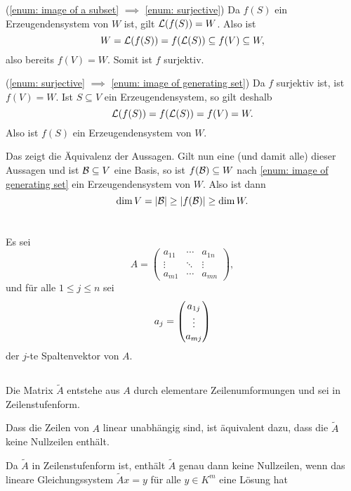 \documentclass[a4paper,10pt]{scrartcl}
\begin{document}
(\ref{enum: image of a subset} $\implies$ \ref{enum: surjective}) Da $f(S)$ ein Erzeugendensystem von $W$ ist, gilt $\mathcal{L}(f(S)) = W$. Also ist
\[
 W = \mathcal{L}(f(S)) =  f(\mathcal{L}(S)) \subseteq f(V) \subseteq W,
\]
also bereits $f(V) = W$. Somit ist $f$ surjektiv.

(\ref{enum: surjective} $\implies$ \ref{enum: image of generating set}) Da $f$ surjektiv ist, ist $f(V) = W$. Ist $S \subseteq V$ ein Erzeugendensystem, so gilt deshalb
\[
 \mathcal{L}(f(S)) = f(\mathcal{L}(S)) = f(V) = W.
\]
Also ist $f(S)$ ein Erzeugendensystem von $W$.

Das zeigt die Äquivalenz der Aussagen. Gilt nun eine (und damit alle) dieser Aussagen und ist $\mathcal{B} \subseteq V$ eine Basis, so ist $f(\mathcal{B}) \subseteq W$ nach \ref{enum: image of generating set} ein Erzeugendensystem von $W$. Also ist dann
\[
 \dim V = |\mathcal{B}| \geq |f(\mathcal{B})| \geq \dim W.
\]











\section{}
Es sei
\[
 A =
 \begin{pmatrix}
  a_{11} & \cdots & a_{1n} \\
  \vdots & \ddots & \vdots \\
  a_{m1} & \cdots & a_{mn}
 \end{pmatrix},
\]
und für alle $1 \leq j \leq n$ sei
\[
 a_j = \begin{pmatrix} a_{1j} \\ \vdots \\ a_{mj} \end{pmatrix}
\]
der $j$-te Spaltenvektor von $A$.





\subsection{}
Die Matrix $\tilde{A}$ entstehe aus $A$ durch elementare Zeilenumformungen und sei in Zeilenstufenform.

Dass die Zeilen von $A$ linear unabhängig sind, ist äquivalent dazu, dass die $\tilde{A}$ keine Nullzeilen enthält.

Da $\tilde{A}$ in Zeilenstufenform ist, enthält $\tilde{A}$ genau dann keine Nullzeilen, wenn das lineare Gleichungssystem $\tilde{A}x = y$ für alle $y \in K^m$ eine Lösung hat
\end{document}
